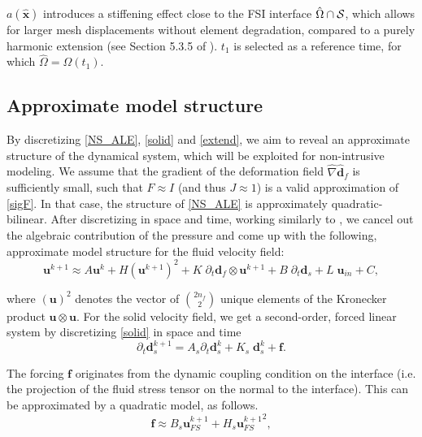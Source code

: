 \documentclass[%
  onecolumn
]{mpi2015-cscpreprint}
\begin{document}
\noindent $a(\hat{\mathbf{x}})$ introduces a stiffening effect close to the FSI interface $\hat{\Omega} \cap \cal S$, which allows for larger mesh displacements without element degradation, compared to a purely harmonic extension (see Section 5.3.5 of \cite{Rich}). $t_1$ is selected as a reference time, for which $\hat{\Omega}=\Omega(t_1)$.

\subsection{Approximate model structure}

By discretizing \cref{NS_ALE}, \cref{solid} and \cref{extend}, we aim to reveal an approximate structure of the dynamical system, which will be exploited for non-intrusive modeling. We assume that the gradient of the deformation field $\hat{\nabla} \hat{\mathbf{d}}_f$ is sufficiently small, such that $F \approx I$ (and thus $J \approx 1$) is a valid approximation of \cref{sigF}. In that case, the structure of \cref{NS_ALE} is approximately quadratic-bilinear. After discretizing in space and time, working similarly to \cite{BennNS}, we cancel out the algebraic contribution of the pressure and come up with the following, approximate model structure for the fluid velocity field:
\begin{equation} 
\label{quadbil}
\mathbf{u}^{k+1} \approx A \mathbf{u}^k + H (\mathbf{u}^{k+1})^2 + K \; \partial_{t} \mathbf{d}_f \otimes \mathbf{u}^{k+1} 
 + B \; \partial_{t} \mathbf{d}_s + L \; \mathbf{u}_{in} + C,
\end{equation}

\noindent where $(\mathbf{u})^2$ denotes the vector of $2n_f \choose 2$ unique elements of the Kronecker product  $\mathbf{u} \otimes \mathbf{u}$.
For the solid velocity field, we get a second-order, forced linear system by discretizing \cref{solid} in space and time
\begin{equation} 
\label{sollin}
\partial_{t} \mathbf{d}_s^{k+1}=A_s \partial_{t} \mathbf{d}_s^{k} + K_s \; \mathbf{d}_s^{k}+\mathbf{f}.
\end{equation}

\noindent The forcing $\mathbf{f}$ originates from the dynamic coupling condition on the interface (i.e. the projection of the fluid stress tensor on the normal to the interface). This can be approximated by a quadratic model, as follows.
\begin{equation} 
\label{forcing}
\mathbf{f} \approx B_s \mathbf{u}_{FS}^{k+1}+H_s {\mathbf{u}_{FS}^{k+1}}^2,
\end{equation}
\end{document}
